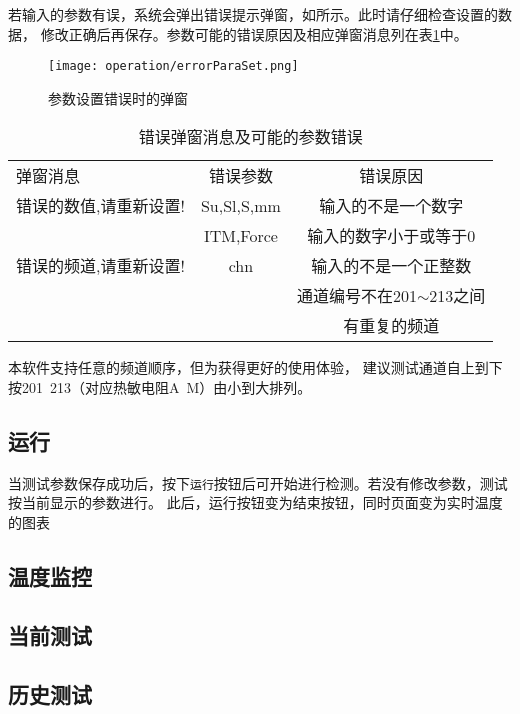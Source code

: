 \begin{note}
    若输入的参数有误，系统会弹出错误提示弹窗，如所示。此时请仔细检查设置的数据，
    修改正确后再保存。参数可能的错误原因及相应弹窗消息列在表\ref{tab:errorInfoNormalUser}中。
\end{note}

\begin{figure}[htbp]
    \centering
    \texttt{[image: operation/errorParaSet.png]}
    \caption{ 参数设置错误时的弹窗 \label{fig:errorParaSet}}
\end{figure}
\begin{table}[htbp]
    \centering
    \caption{ 错误弹窗消息及可能的参数错误 \label{tab:errorInfoNormalUser}}
    \begin{tabular}{@{}lcc@{}}
        弹窗消息               & 错误参数   & 错误原因                     \\
        错误的数值,请重新设置! & Su,Sl,S,mm & 输入的不是一个数字           \\
                               & ITM,Force  & 输入的数字小于或等于0        \\
        错误的频道,请重新设置! & chn        & 输入的不是一个正整数         \\
                               &            & 通道编号不在201$\sim$213之间 \\
                               &            & 有重复的频道
    \end{tabular}
\end{table}
\begin{note}
    本软件支持任意的频道顺序，但为获得更好的使用体验，
    建议测试通道自上到下按201~213（对应热敏电阻A~M）由小到大排列。
\end{note}
\subsection{运行}
当测试参数保存成功后，按下\lstinline{运行}按钮后可开始进行检测。若没有修改参数，测试按当前显示的参数进行。
此后，运行按钮变为结束按钮，同时页面变为实时温度的图表
\subsection{温度监控}
\subsection{当前测试}
\subsection{历史测试}
